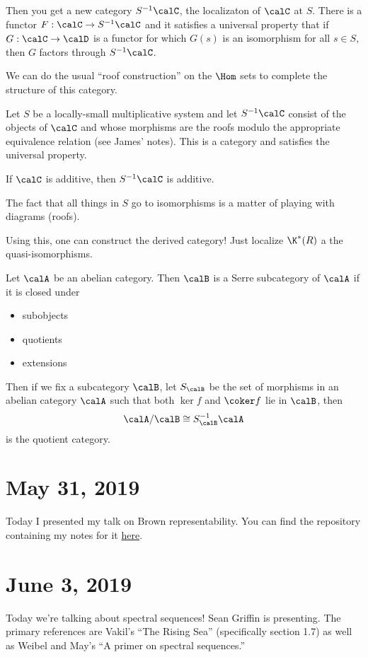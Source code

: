 \documentclass[12pt]{article}
\begin{document}
Then you get a new category $S^{-1}\calC$, the localizaton of $\calC$ at $S$. There is a functor $F:\calC\to S^{-1}\calC$ and it satisfies 
a universal property that if $G:\calC\to\calD$ is a functor for which $G(s)$ is an isomorphism for all $s\in S$, then $G$
factors through $S^{-1}\calC$.

We can do the usual ``roof construction'' on the $\Hom$ sets to complete the structure of this category.
\begin{thm}
	Let $S$ be a locally-small multiplicative system and let $S^{-1}\calC$ consist of the objects of $\calC$
	and whose morphisms are the roofs modulo the appropriate equivalence relation (see James' notes). This is a category and 
	satisfies the universal property.
\end{thm}
\begin{rmk}
	If $\calC$ is additive, then $S^{-1}\calC$ is additive.
\end{rmk}
\begin{rmk}
	The fact that all things in $S$ go to isomorphisms is a matter of playing with diagrams (roofs).
\end{rmk}

Using this, one can construct the derived category! Just localize $\K^\ast(R)$ a the quasi-isomorphisms.

\begin{defn}
	Let $\calA$ be an abelian category. Then $\calB$ is a Serre subcategory of $\calA$ if it is closed under
	\begin{itemize}
		\item subobjects
		\item quotients
		\item extensions
	\end{itemize}
\end{defn}
Then if we fix a subcategory $\calB$, let $S_\calB$ be the set of morphisms in an abelian category $\calA$ such that
both $\ker f$ and $\coker f$ lie in $\calB$, then 
\[\calA/\calB\cong S_\calB^{-1}\calA\]
is the quotient category.

\section{May 31, 2019}
Today I presented my talk on Brown representability. You can find the repository containing my notes for it \href{https://github.com/NicoCourts/Brown-Representability}{here}.

\section{June 3, 2019}
Today we're talking about spectral sequences! Sean Griffin is presenting. The primary references are Vakil's ``The Rising Sea'' (specifically section 1.7)
as well as Weibel and May's ``A primer on spectral sequences.''
\end{document}
